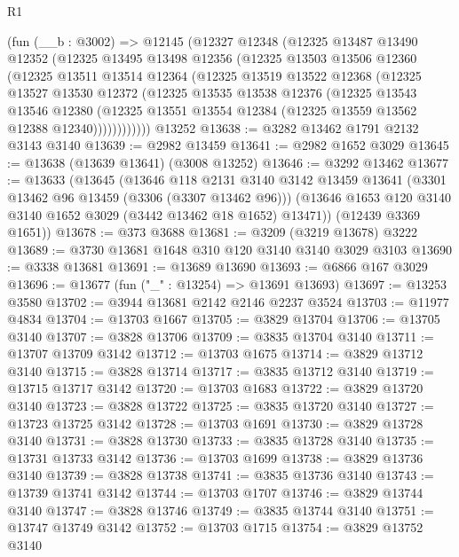\begin{lexlean}{R1}
\begin{coremodule}
    (fun (__b : @3002) =>
    @12145
      (@12327
        @12348
        (@12325
          @13487
          @13490
          @12352
          (@12325
            @13495
            @13498
            @12356
            (@12325
              @13503
              @13506
              @12360
              (@12325
                @13511
                @13514
                @12364
                (@12325
                  @13519
                  @13522
                  @12368
                  (@12325
                    @13527
                    @13530
                    @12372
                    (@12325
                      @13535
                      @13538
                      @12376
                      (@12325
                        @13543
                        @13546
                        @12380
                        (@12325 @13551 @13554 @12384 (@12325 @13559 @13562 @12388 @12340))))))))))))
    @13252
@13638 := @3282 @13462 @1791 @2132 @3143 @3140
@13639 := @2982 @13459
@13641 := @2982 @1652 @3029
@13645 := @13638 (@13639 @13641) (@3008 @13252)
@13646 := @3292 @13462
@13677 := @13633
    (@13645
      (@13646
        @118
        @2131
        @3140
        @3142
        @13459
        @13641
        (@3301 @13462 @96 @13459 (@3306 (@3307 @13462 @96)))
        (@13646 @1653 @120 @3140 @3140 @1652 @3029 (@3442 @13462 @18 @1652) @13471))
      (@12439 @3369 @1651))
@13678 := @373 @3688
@13681 := @3209 (@3219 @13678) @3222
@13689 := @3730 @13681 @1648 @310 @120 @3140 @3140 @3029 @3103
@13690 := @3338 @13681
@13691 := @13689 @13690
@13693 := @6866 @167 @3029
@13696 := @13677 (fun ("_" : @13254) => @13691 @13693)
@13697 := @13253 @3580
@13702 := @3944 @13681 @2142 @2146 @2237 @3524
@13703 := @11977 @4834
@13704 := @13703 @1667
@13705 := @3829 @13704
@13706 := @13705 @3140
@13707 := @3828 @13706
@13709 := @3835 @13704 @3140
@13711 := @13707 @13709 @3142
@13712 := @13703 @1675
@13714 := @3829 @13712 @3140
@13715 := @3828 @13714
@13717 := @3835 @13712 @3140
@13719 := @13715 @13717 @3142
@13720 := @13703 @1683
@13722 := @3829 @13720 @3140
@13723 := @3828 @13722
@13725 := @3835 @13720 @3140
@13727 := @13723 @13725 @3142
@13728 := @13703 @1691
@13730 := @3829 @13728 @3140
@13731 := @3828 @13730
@13733 := @3835 @13728 @3140
@13735 := @13731 @13733 @3142
@13736 := @13703 @1699
@13738 := @3829 @13736 @3140
@13739 := @3828 @13738
@13741 := @3835 @13736 @3140
@13743 := @13739 @13741 @3142
@13744 := @13703 @1707
@13746 := @3829 @13744 @3140
@13747 := @3828 @13746
@13749 := @3835 @13744 @3140
@13751 := @13747 @13749 @3142
@13752 := @13703 @1715
@13754 := @3829 @13752 @3140

\end{coremodule}
\end{lexlean}
